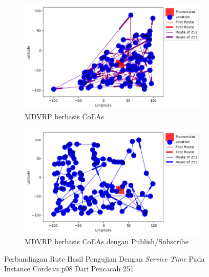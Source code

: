 \begin{figure}[H]
	\centering
	\begin{subfigure}[t]{\textwidth}
		\centering
		\includegraphics[width=\textwidth]{Resources/Images/cordeau_p08_tw/cordeau_p08_tw_251_coes}
		\caption{MDVRP berbasis CoEAs}
		\label{fig:cordeau_p08_tw_251_coes}
	\end{subfigure}
	\begin{subfigure}[t]{\textwidth}
		\centering
		\includegraphics[width=\textwidth]{Resources/Images/cordeau_p08_tw/cordeau_p08_tw_251_pubsub_coes}
		\caption{MDVRP berbasis CoEAs dengan Publish/Subscribe}
		\label{fig:cordeau_p08_tw_251_pubsub_coes}
	\end{subfigure}
	\caption{Perbandingan Rute Hasil Pengujian Dengan \textit{Service Time} Pada Instance Cordeau p08 Dari Pencacah 251}
	\label{fig:cordeau_p08_tw_251}
\end{figure}


